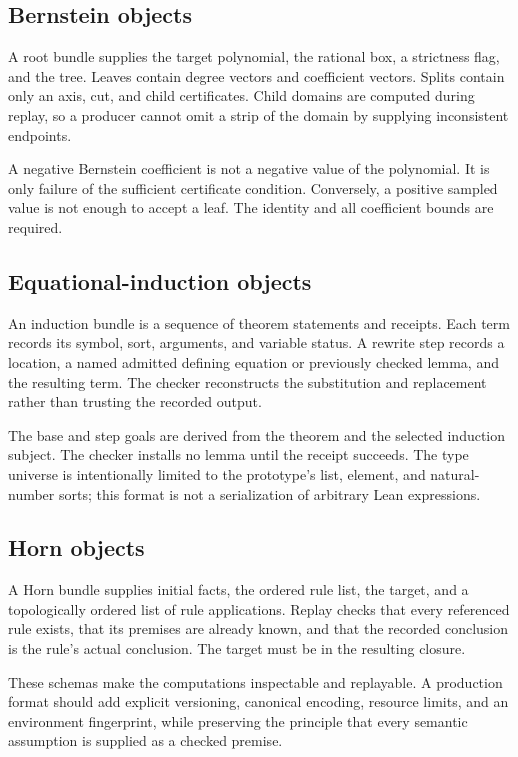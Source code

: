 \documentclass[11pt,letterpaper]{article}
\newcommand{\Lean}{\textsf{Lean}}
\theoremstyle{definition}
\theoremstyle{remark}
\begin{document}
\subsection{Bernstein objects}
A root bundle supplies the target polynomial, the rational box, a strictness flag, and the tree. Leaves contain degree vectors and coefficient vectors. Splits contain only an axis, cut, and child certificates. Child domains are computed during replay, so a producer cannot omit a strip of the domain by supplying inconsistent endpoints.

A negative Bernstein coefficient is not a negative value of the polynomial. It is only failure of the sufficient certificate condition. Conversely, a positive sampled value is not enough to accept a leaf. The identity and all coefficient bounds are required.

\subsection{Equational-induction objects}
An induction bundle is a sequence of theorem statements and receipts. Each term records its symbol, sort, arguments, and variable status. A rewrite step records a location, a named admitted defining equation or previously checked lemma, and the resulting term. The checker reconstructs the substitution and replacement rather than trusting the recorded output.

The base and step goals are derived from the theorem and the selected induction subject. The checker installs no lemma until the receipt succeeds. The type universe is intentionally limited to the prototype's list, element, and natural-number sorts; this format is not a serialization of arbitrary \Lean{} expressions.

\subsection{Horn objects}
A Horn bundle supplies initial facts, the ordered rule list, the target, and a topologically ordered list of rule applications. Replay checks that every referenced rule exists, that its premises are already known, and that the recorded conclusion is the rule's actual conclusion. The target must be in the resulting closure.

These schemas make the computations inspectable and replayable. A production format should add explicit versioning, canonical encoding, resource limits, and an environment fingerprint, while preserving the principle that every semantic assumption is supplied as a checked premise.
\end{document}
